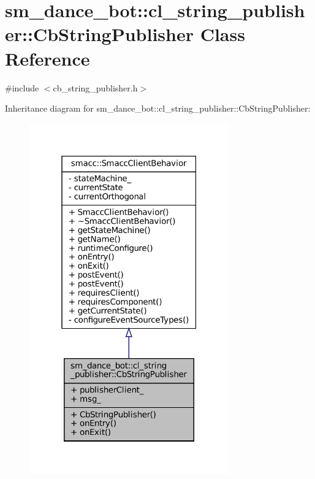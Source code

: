 \hypertarget{classsm__dance__bot_1_1cl__string__publisher_1_1CbStringPublisher}{}\section{sm\+\_\+dance\+\_\+bot\+:\+:cl\+\_\+string\+\_\+publisher\+:\+:Cb\+String\+Publisher Class Reference}
\label{classsm__dance__bot_1_1cl__string__publisher_1_1CbStringPublisher}


{\ttfamily \#include $<$cb\+\_\+string\+\_\+publisher.\+h$>$}



Inheritance diagram for sm\+\_\+dance\+\_\+bot\+:\+:cl\+\_\+string\+\_\+publisher\+:\+:Cb\+String\+Publisher\+:
\nopagebreak
\begin{figure}[H]
\begin{center}
\leavevmode
\includegraphics[width=244pt]{classsm__dance__bot_1_1cl__string__publisher_1_1CbStringPublisher__inherit__graph}
\end{center}
\end{figure}


